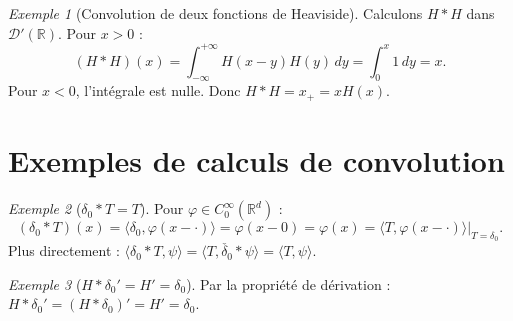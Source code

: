 \documentclass[12pt,a4paper,openany]{book}
\theoremstyle{definition}
\theoremstyle{plain}
\theoremstyle{remark}
\newtheorem*{example}{Exemple}
\newenvironment{exemple}{\begin{example}}{\end{example}}
\begin{document}
	\begin{exemple}[Convolution de deux fonctions de Heaviside]
		Calculons $H * H$ dans $\mathcal{D}'(\mathbb{R})$. Pour $x > 0$ :
		\[
		(H * H)(x) = \int_{-\infty}^{+\infty} H(x-y)H(y)\,dy = \int_0^x 1\,dy = x.
		\]
		Pour $x < 0$, l'intégrale est nulle. Donc $H * H = x_+ = xH(x)$.
	\end{exemple}
	
	\section{Exemples de calculs de convolution}
	
	\begin{exemple}[$\delta_0 * T = T$]
		Pour $\varphi \in C_0^\infty(\mathbb{R}^d)$ :
		\[
		(\delta_0 * T)(x) = \langle \delta_0, \varphi(x - \cdot) \rangle = \varphi(x - 0) = \varphi(x) = \langle T, \varphi(x-\cdot) \rangle \big|_{T=\delta_0}.
		\]
		Plus directement : $\langle \delta_0 * T, \psi \rangle = \langle T, \check{\delta_0} * \psi \rangle = \langle T, \psi \rangle$.
	\end{exemple}
	
	\begin{exemple}[$H * \delta_0' = H' = \delta_0$]
		Par la propriété de dérivation : $H * \delta_0' = (H * \delta_0)' = H' = \delta_0$.
	\end{exemple}
	
\end{document}

